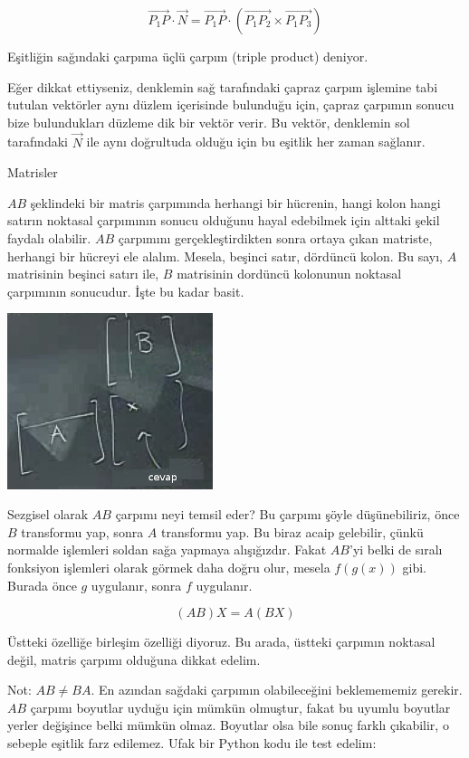 \documentclass[12pt,fleqn]{article}\usepackage{../../common}
\begin{document}
$$ \vec{P_1P} \cdot \vec{N} = 
\vec{P_1P} \cdot (\vec{P_1P_2} \times \vec{P_1P_3})
$$

Eşitliğin sağındaki çarpıma üçlü çarpım (triple product) deniyor. 

Eğer dikkat ettiyseniz, denklemin sağ tarafındaki çapraz çarpım işlemine tabi 
tutulan vektörler aynı düzlem içerisinde bulunduğu için, çapraz çarpımın sonucu 
bize bulundukları düzleme dik bir vektör verir. Bu vektör, denklemin sol 
tarafındaki $\vec{N}$ ile aynı doğrultuda olduğu için bu eşitlik her zaman 
sağlanır.


Matrisler

$AB$ şeklindeki bir matris çarpımında herhangi bir hücrenin, hangi kolon hangi
satırın noktasal çarpımının sonucu olduğunu hayal edebilmek için
alttaki şekil faydalı olabilir. $AB$ çarpımını gerçekleştirdikten sonra ortaya 
çıkan matriste, herhangi bir hücreyi ele alalım. Mesela, beşinci satır, dördüncü 
kolon. Bu sayı, $A$ matrisinin beşinci satırı ile, $B$ matrisinin dordüncü 
kolonunun noktasal çarpımının sonucudur. İşte bu kadar basit.

\begin{center}


\includegraphics[width=6cm]{3_4.png}


\end{center}


Sezgisel olarak $AB$ çarpımı neyi temsil eder? Bu çarpımı şöyle
düşünebiliriz, önce $B$ transformu yap, sonra $A$ transformu yap. Bu biraz
acaip gelebilir, çünkü normalde işlemleri soldan sağa yapmaya
alışığızdır. Fakat $AB$'yi belki de sıralı fonksiyon işlemleri olarak
görmek daha doğru olur, mesela $f(g(x))$ gibi. Burada önce $g$ uygulanır,
sonra $f$ uygulanır. 

$$ (AB)X = A(BX) $$

Üstteki özelliğe birleşim özelliği diyoruz. Bu arada, üstteki çarpımın noktasal 
değil, matris çarpımı
olduğuna dikkat edelim. 

Not: $AB \ne BA$. En azından sağdaki çarpımın olabileceğini beklemememiz
gerekir. $AB$ çarpımı boyutlar uyduğu için mümkün olmuştur, fakat bu uyumlu
boyutlar yerler değişince belki mümkün olmaz. Boyutlar olsa bile sonuç
farklı çıkabilir, o sebeple eşitlik farz edilemez. Ufak bir Python kodu ile
test edelim:
\end{document}
